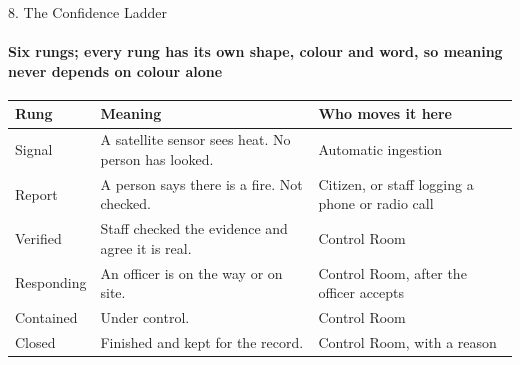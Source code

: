 \begin{frame}{8. The Confidence Ladder}
\framesubtitle{Six rungs; every rung has its own shape, colour and word, so meaning never depends on colour alone}
\scriptsize
\renewcommand{\arraystretch}{1.3}
\begin{center}
\begin{tabular}{p{} p{} p{}}
\toprule
\textbf{Rung} & \textbf{Meaning} & \textbf{Who moves it here} \\
\midrule
Signal & A satellite sensor sees heat. No person has looked. & Automatic ingestion \\
Report & A person says there is a fire. Not checked. & Citizen, or staff logging a phone or radio call \\
Verified & Staff checked the evidence and agree it is real. & Control Room \\
Responding & An officer is on the way or on site. & Control Room, after the officer accepts \\
Contained & Under control. & Control Room \\
Closed & Finished and kept for the record. & Control Room, with a reason \\
\bottomrule
\end{tabular}
\end{center}
\vspace{0.1cm}
\begin{center}
\end{center}
\end{frame}

